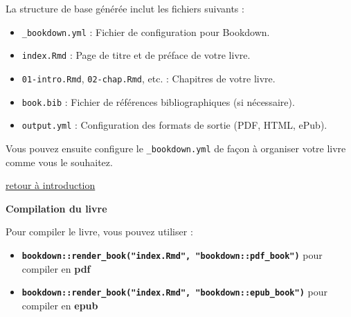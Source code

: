\documentclass[
  12pt,
]{article}
\providecommand{\tightlist}{%
  \setlength{\itemsep}{0pt}\setlength{\parskip}{0pt}}
\begin{document}
La structure de base générée inclut les fichiers suivants :

\begin{itemize}
\tightlist
\item
  \texttt{\_bookdown.yml} : Fichier de configuration pour Bookdown.
\item
  \texttt{index.Rmd} : Page de titre et de préface de votre livre.
\item
  \texttt{01-intro.Rmd}, \texttt{02-chap.Rmd}, etc. : Chapitres de votre
  livre.
\item
  \texttt{book.bib} : Fichier de références bibliographiques (si
  nécessaire).
\item
  \texttt{output.yml} : Configuration des formats de sortie (PDF, HTML,
  ePub).
\end{itemize}

Vous pouvez ensuite configure le \texttt{\_bookdown.yml} de façon à
organiser votre livre comme vous le souhaitez.

\hyperref[Introduction]{retour à introduction}

\textbf{Compilation du livre}

Pour compiler le livre, vous pouvez utiliser :

\begin{itemize}
\item
  \textbf{\texttt{bookdown::render\_book("index.Rmd",\ "bookdown::pdf\_book")}}
  pour compiler en \textbf{pdf}
\item
  \textbf{\texttt{bookdown::render\_book("index.Rmd",\ "bookdown::epub\_book")}}
  pour compiler en \textbf{epub}
\end{itemize}


\end{document}
